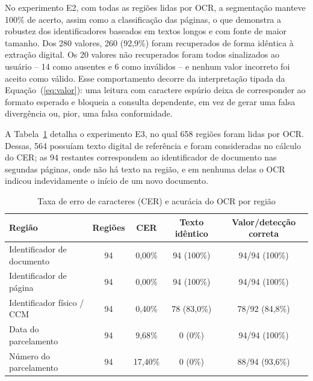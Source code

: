 \documentclass[article,12pt,oneside,a4paper,english,brazil]{abntex2}
\begin{document}
No experimento E2, com todas as regiões lidas por OCR, a segmentação manteve 100\% de
acerto, assim como a classificação das páginas, o que demonstra a robustez dos
identificadores baseados em textos longos e com fonte de maior tamanho. Dos 280 valores,
260 (92,9\%) foram recuperados de forma idêntica à extração digital. Os 20 valores não
recuperados foram todos sinalizados ao usuário -- 14 como ausentes e 6 como
inválidos -- e nenhum valor incorreto foi aceito como válido. Esse comportamento decorre
da interpretação tipada da Equação~(\ref{eq:valor}): uma leitura com caractere espúrio
deixa de corresponder ao formato esperado e bloqueia a consulta dependente, em vez de
gerar uma falsa divergência ou, pior, uma falsa conformidade.

A Tabela~\ref{tab:cer} detalha o experimento E3, no qual 658 regiões foram lidas por OCR.
Dessas, 564 possuíam texto digital de referência e foram consideradas no cálculo do CER;
as 94 restantes correspondem ao identificador de documento nas segundas páginas, onde não
há texto na região, e em nenhuma delas o OCR indicou indevidamente o início de um novo
documento.

\begin{table}[htb]
\centering
\footnotesize
\caption{Taxa de erro de caracteres (CER) e acurácia do OCR por região}\label{tab:cer}
\begin{tabular}{lcccc}
\toprule
Região & Regiões & CER & Texto idêntico & Valor/detecção correta \\
\midrule
Identificador de documento & 94 & 0,00\% & 94 (100\%) & 94/94 (100\%) \\
Identificador de página & 94 & 0,00\% & 94 (100\%) & 94/94 (100\%) \\
Identificador físico / CCM & 94 & 0,40\% & 78 (83,0\%) & 78/92 (84,8\%) \\
Data do parcelamento & 94 & 9,68\% & 0 (0\%) & 94/94 (100\%) \\
Número do parcelamento & 94 & 17,40\% & 0 (0\%) & 88/94 (93,6\%) \\
\bottomrule
\end{tabular}
\end{table}
\end{document}
